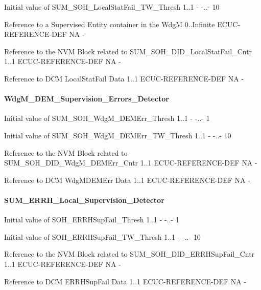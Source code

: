 {{{{{{{{{{{{{{
{Initial value of SUM_SOH_LocalStatFail_TW_Thresh}
{1..1}
{-}
{-..-}
{10}}

{
{Reference to a Supervised Entity container in the WdgM}
{0..Infinite}
{ECUC-REFERENCE-DEF}
{NA}
{-}}

{
{Reference to the NVM Block related to SUM_SOH_DID_LocalStatFail_Cntr}
{1..1}
{ECUC-REFERENCE-DEF}
{NA}
{-}}

{
{Reference to DCM LocalStatFail Data}
{1..1}
{ECUC-REFERENCE-DEF}
{NA}
{-}}

\paragraph{WdgM\_DEM\_Supervision\_Errors\_Detector}
{
{Initial value of SUM_SOH_WdgM_DEMErr_Thresh}
{1..1}
{-}
{-..-}
{1}}


{
{Initial value of SUM_SOH_WdgM_DEMErr_TW_Thresh}
{1..1}
{-}
{-..-}
{10}}


{
{Reference to the NVM Block related to SUM_SOH_DID_WdgM_DEMErr_Cntr}
{1..1}
{ECUC-REFERENCE-DEF}
{NA}
{-}}

{
{Reference to DCM WdgMDEMErr Data}
{1..1}
{ECUC-REFERENCE-DEF}
{NA}
{-}}

\paragraph{SUM\_ERRH\_Local\_Supervision\_Detector}
{
{Initial value of SOH_ERRHSupFail_Thresh}
{1..1}
{-}
{-..-}
{1}}


{
{Initial value of SOH_ERRHSupFail_TW_Thresh}
{1..1}
{-}
{-..-}
{10}}


{
{Reference to the NVM Block related to SUM_SOH_DID_ERRHSupFail_Cntr}
{1..1}
{ECUC-REFERENCE-DEF}
{NA}
{-}}

{
{Reference to DCM ERRHSupFail Data}
{1..1}
{ECUC-REFERENCE-DEF}
{NA}
{-}}

}}}}}}}}}}}}}
